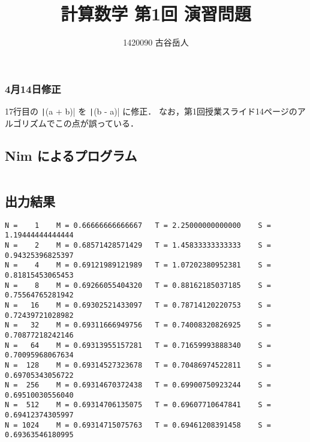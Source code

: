 \documentclass[uplatex,dvipdfmx,a4paper]{jsarticle}
\title{計算数学 第1回 演習問題}
\author{1420090 古谷岳人}
\begin{document}
  \maketitle

  \subsubsection*{4月14日修正}
  17行目の \texttt|(a + b)| を \texttt|(b - a)| に修正．
  なお，第1回授業スライド14ページのアルゴリズムでこの点が誤っている．
  \subsection*{Nim によるプログラム}
\inputminted[linenos]{nim}{Kadai01.nim}
  \subsection*{出力結果}
  \begin{verbatim}
N =    1    M = 0.66666666666667   T = 2.25000000000000    S = 1.19444444444444
N =    2    M = 0.68571428571429   T = 1.45833333333333    S = 0.94325396825397
N =    4    M = 0.69121989121989   T = 1.07202380952381    S = 0.81815453065453
N =    8    M = 0.69266055404320   T = 0.88162185037185    S = 0.75564765281942
N =   16    M = 0.69302521433097   T = 0.78714120220753    S = 0.72439721028982
N =   32    M = 0.69311666949756   T = 0.74008320826925    S = 0.70877218242146
N =   64    M = 0.69313955157281   T = 0.71659993888340    S = 0.70095968067634
N =  128    M = 0.69314527323678   T = 0.70486974522811    S = 0.69705343056722
N =  256    M = 0.69314670372438   T = 0.69900750923244    S = 0.69510030556040
N =  512    M = 0.69314706135075   T = 0.69607710647841    S = 0.69412374305997
N = 1024    M = 0.69314715075763   T = 0.69461208391458    S = 0.69363546180995
  \end{verbatim}
\end{document}
